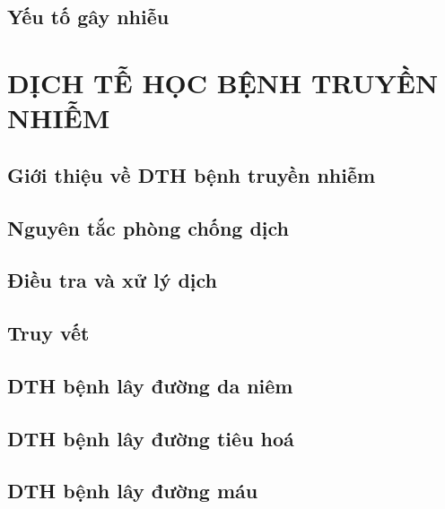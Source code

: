 \documentclass[
]{book}
\begin{document}
\hypertarget{dthcb_nhieu}{%
\chapter{Yếu tố gây nhiễu}\label{dthcb_nhieu}}

\hypertarget{part-dux1ecbch-tux1ec5-hux1ecdc-bux1ec7nh-truyux1ec1n-nhiux1ec5m}{%
\part{DỊCH TỄ HỌC BỆNH TRUYỀN NHIỄM}\label{part-dux1ecbch-tux1ec5-hux1ecdc-bux1ec7nh-truyux1ec1n-nhiux1ec5m}}

\hypertarget{dthbtn_gioithieu}{%
\chapter{Giới thiệu về DTH bệnh truyền nhiễm}\label{dthbtn_gioithieu}}

\hypertarget{dthbtn_pcdich}{%
\chapter{Nguyên tắc phòng chống dịch}\label{dthbtn_pcdich}}

\hypertarget{dthbtn_dieutradich}{%
\chapter{Điều tra và xử lý dịch}\label{dthbtn_dieutradich}}

\hypertarget{dthbtn_truyvet}{%
\chapter{Truy vết}\label{dthbtn_truyvet}}

\hypertarget{dthbtn_daniem}{%
\chapter{DTH bệnh lây đường da niêm}\label{dthbtn_daniem}}

\hypertarget{dthbtn_tieuhoa}{%
\chapter{DTH bệnh lây đường tiêu hoá}\label{dthbtn_tieuhoa}}

\hypertarget{dthbtn_mau}{%
\chapter{DTH bệnh lây đường máu}\label{dthbtn_mau}}
\end{document}
